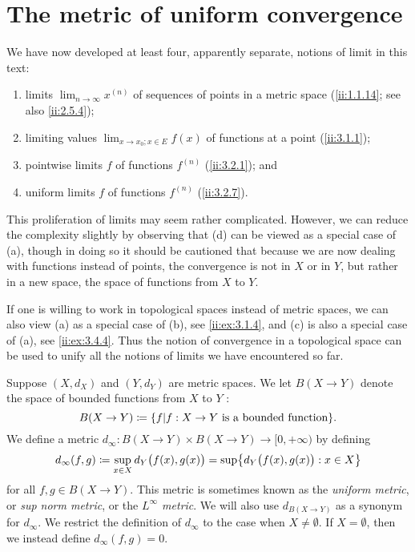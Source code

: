 \section{The metric of uniform convergence}\label{ii:sec:3.4}

\begin{note}
  We have now developed at least four, apparently separate, notions of limit in this text:
  \begin{enumerate}
    \item limits \(\lim_{n \to \infty} x^{(n)}\) of sequences of points in a metric space
          (\cref{ii:1.1.14};
          see also \cref{ii:2.5.4});
    \item limiting values \(\lim_{x \to x_0 ; x \in E} f(x)\) of functions at a point
          (\cref{ii:3.1.1});
    \item pointwise limits \(f\) of functions \(f^{(n)}\)
          (\cref{ii:3.2.1});
          and
    \item uniform limits \(f\) of functions \(f^{(n)}\)
          (\cref{ii:3.2.7}).
  \end{enumerate}

  This proliferation of limits may seem rather complicated.
  However, we can reduce the complexity slightly by observing that (d) can be viewed as a special case of (a), though in doing so it should be cautioned that because we are now dealing with functions instead of points, the convergence is not in \(X\) or in \(Y\), but rather in a new space, the space of functions from \(X\) to \(Y\).
\end{note}

\begin{rmk}\label{ii:3.4.1}
  If one is willing to work in topological spaces instead of metric spaces, we can also view (a) as a special case of (b), see \cref{ii:ex:3.1.4}, and (c) is also a special case of (a), see \cref{ii:ex:3.4.4}.
  Thus the notion of convergence in a topological space can be used to unify all the notions of limits we have encountered so far.
\end{rmk}

\begin{defn}\label{ii:3.4.2}
  Suppose \((X, d_X)\) and \((Y, d_Y)\) are metric spaces.
  We let \(B(X \to Y)\) denote the space of bounded functions from \(X\) to \(Y\) :
  \[
    B(X \to Y) \coloneqq \set{f | f : X \to Y \text{ is a bounded function}}.
  \]
  We define a metric \(d_\infty : B(X \to Y) \times B(X \to Y) \to [0, +\infty)\) by defining
  \[
    d_\infty(f, g) \coloneqq \sup_{x \in X} d_Y\big(f(x), g(x)\big) = \sup\set{d_Y\big(f(x), g(x)\big) : x \in X}
  \]
  for all \(f, g \in B(X \to Y)\).
  This metric is sometimes known as the \emph{uniform metric}, or \emph{sup norm metric}, or the \emph{\(L^\infty\) metric}.
  We will also use \(d_{B(X \to Y)}\) as a synonym for \(d_\infty\).
  We restrict the definition of \(d_\infty\) to the case when \(X \neq \emptyset\).
  If \(X = \emptyset\), then we instead define \(d_\infty(f, g) = 0\).
\end{defn}

